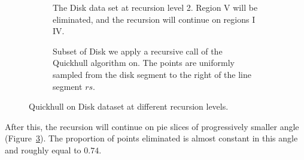 \begin{figure}[ht]
    \begin{subfigure}{0.4\textwidth}
        \caption{The Disk data set at recursion level 2. Region V will be 
                 eliminated, and the recursion will continue on regions I 
                 \textemdash IV.}
        \label{fig:disk_level2}
    \end{subfigure}
    \hfill
    \begin{subfigure}{0.4\textwidth}
        \caption{Subset of Disk we apply a recursive call of the Quickhull 
                 algorithm on. The points are uniformly sampled from the disk
                 segment to the right of the line segment $rs$.}
        \label{fig:disk_level3+}
    \end{subfigure}
    \caption{Quickhull on Disk dataset at different recursion levels.}
\end{figure}

After this, the recursion will continue on pie slices of progressively smaller
angle (Figure~\ref{fig:disk_level3+}).
The proportion of points eliminated is almost constant in this angle and roughly
equal to $0.74$.

